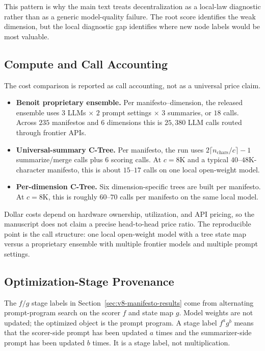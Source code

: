 This pattern is why the main text treats decentralization as a local-law
diagnostic rather than as a generic model-quality failure. The root score
identifies the weak dimension, but the local diagnostic gap identifies where
new node labels would be most valuable.

\subsection{Compute and Call Accounting}

The cost comparison is reported as call accounting, not as a universal price
claim.

\begin{itemize}[leftmargin=1.5em]
    \item \textbf{Benoit proprietary ensemble.} Per
          manifesto--dimension, the released ensemble uses
          \(3\) LLMs \(\times\) \(2\) prompt settings \(\times\)
          \(3\) summaries, or \(18\) calls. Across \(235\) manifestos and
          \(6\) dimensions this is \(25{,}380\) LLM calls routed through
          frontier APIs.
    \item \textbf{Universal-summary C-Tree.} Per manifesto, the run uses
          \(2\lceil n_{\mathrm{chars}}/c\rceil-1\) summarize/merge calls plus
          \(6\) scoring calls. At \(c=8\mathrm{K}\) and a typical
          \(40\)--\(48\)K-character manifesto, this is about \(15\)--\(17\)
          calls on one local open-weight model.
    \item \textbf{Per-dimension C-Tree.} Six dimension-specific trees are
          built per manifesto. At \(c=8\mathrm{K}\), this is roughly
          \(60\)--\(70\) calls per manifesto on the same local model.
\end{itemize}

Dollar costs depend on hardware ownership, utilization, and API pricing, so
the manuscript does not claim a precise head-to-head price ratio. The
reproducible point is the call structure: one local open-weight model with a
tree state map versus a proprietary ensemble with multiple frontier models and
multiple prompt settings.

\subsection{Optimization-Stage Provenance}
\label{app:v8-rile-fg-ladder}

The \(f/g\) stage labels in Section~\ref{sec:v8-manifesto-results} come from
alternating prompt-program search on the scorer \(f\) and state map \(g\).
Model weights are not updated; the optimized object is the prompt program. A
stage label \(f^a g^b\) means that the scorer-side prompt has been updated
\(a\) times and the summarizer-side prompt has been updated \(b\) times. It is
a stage label, not multiplication.

